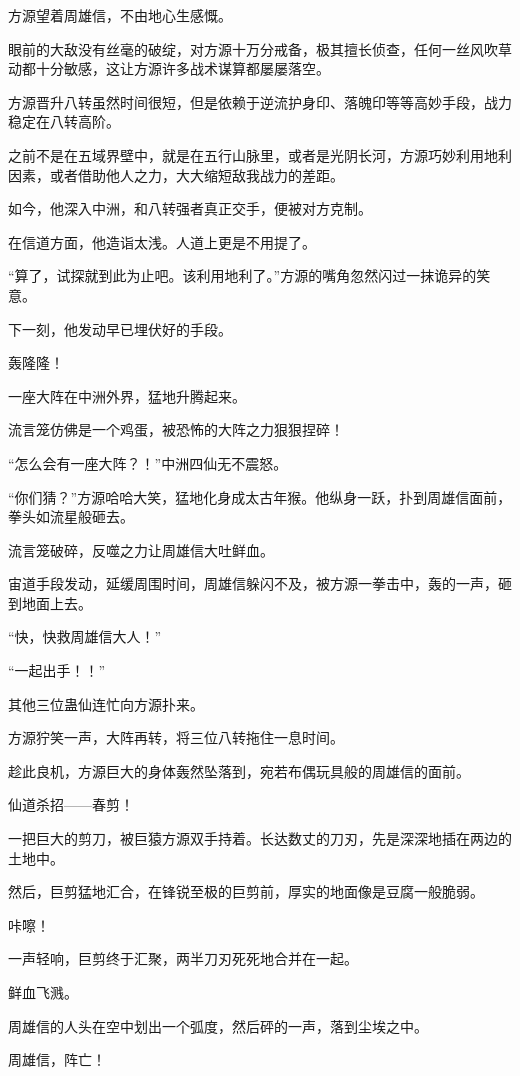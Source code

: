 \begin{this_body}
方源望着周雄信，不由地心生感慨。

眼前的大敌没有丝毫的破绽，对方源十万分戒备，极其擅长侦查，任何一丝风吹草动都十分敏感，这让方源许多战术谋算都屡屡落空。

方源晋升八转虽然时间很短，但是依赖于逆流护身印、落魄印等等高妙手段，战力稳定在八转高阶。

之前不是在五域界壁中，就是在五行山脉里，或者是光阴长河，方源巧妙利用地利因素，或者借助他人之力，大大缩短敌我战力的差距。

如今，他深入中洲，和八转强者真正交手，便被对方克制。

在信道方面，他造诣太浅。人道上更是不用提了。

“算了，试探就到此为止吧。该利用地利了。”方源的嘴角忽然闪过一抹诡异的笑意。

下一刻，他发动早已埋伏好的手段。

轰隆隆！

一座大阵在中洲外界，猛地升腾起来。

流言笼仿佛是一个鸡蛋，被恐怖的大阵之力狠狠捏碎！

“怎么会有一座大阵？！”中洲四仙无不震怒。

“你们猜？”方源哈哈大笑，猛地化身成太古年猴。他纵身一跃，扑到周雄信面前，拳头如流星般砸去。

流言笼破碎，反噬之力让周雄信大吐鲜血。

宙道手段发动，延缓周围时间，周雄信躲闪不及，被方源一拳击中，轰的一声，砸到地面上去。

“快，快救周雄信大人！”

“一起出手！！”

其他三位蛊仙连忙向方源扑来。

方源狞笑一声，大阵再转，将三位八转拖住一息时间。

趁此良机，方源巨大的身体轰然坠落到，宛若布偶玩具般的周雄信的面前。

仙道杀招——春剪！

一把巨大的剪刀，被巨猿方源双手持着。长达数丈的刀刃，先是深深地插在两边的土地中。

然后，巨剪猛地汇合，在锋锐至极的巨剪前，厚实的地面像是豆腐一般脆弱。

咔嚓！

一声轻响，巨剪终于汇聚，两半刀刃死死地合并在一起。

鲜血飞溅。

周雄信的人头在空中划出一个弧度，然后砰的一声，落到尘埃之中。

周雄信，阵亡！

\end{this_body}

